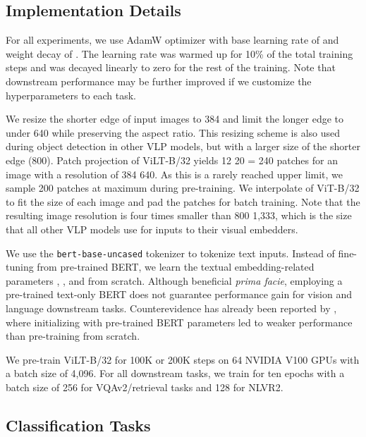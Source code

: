 \documentclass{article}
\begin{document}
\subsection{Implementation Details}

For all experiments, we use AdamW optimizer \citep{loshchilov2018decoupled} with base learning rate of  and weight decay of .
The learning rate was warmed up for 10\% of the total training steps and was decayed linearly to zero for the rest of the training.
Note that downstream performance may be further improved if we customize the hyperparameters to each task.

We resize the shorter edge of input images to 384 and limit the longer edge to under 640 while preserving the aspect ratio.
This resizing scheme is also used during object detection in other VLP models, but with a larger size of the shorter edge (800).
Patch projection of ViLT-B/32 yields 12  20 = 240 patches for an image with a resolution of 384  640. As this is a rarely reached upper limit, we sample 200 patches at maximum during pre-training.
We interpolate  of ViT-B/32 to fit the size of each image and pad the patches for batch training.
Note that the resulting image resolution is four times smaller than 800  1,333, which is the size that all other VLP models use for inputs to their visual embedders.

We use the \texttt{bert-base-uncased} tokenizer to tokenize text inputs.
Instead of fine-tuning from pre-trained BERT, we learn the textual embedding-related parameters , , and  from scratch.
Although beneficial \textit{prima facie}, employing a pre-trained text-only BERT does not guarantee performance gain for vision and language downstream tasks.
Counterevidence has already been reported by \citet{tan2019lxmert}, where initializing with pre-trained BERT parameters led to weaker performance than pre-training from scratch.

We pre-train ViLT-B/32 for 100K or 200K steps on 64 NVIDIA V100 GPUs with a batch size of 4,096.
For all downstream tasks, we train for ten epochs with a batch size of 256 for VQAv2/retrieval tasks and 128 for NLVR2.

\subsection{Classification Tasks}
\end{document}
